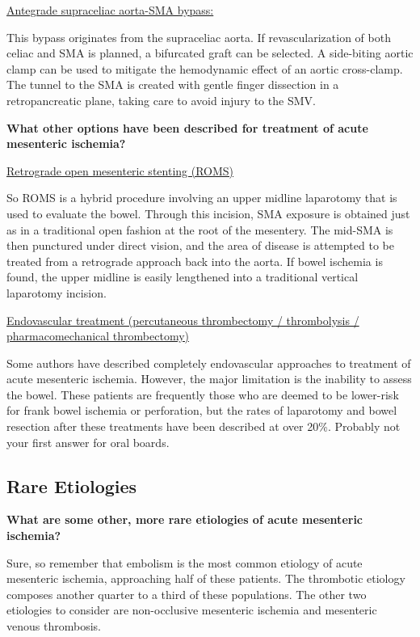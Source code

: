 \documentclass[
]{book}
\begin{document}
\underline{Antegrade supraceliac aorta-SMA bypass:}

This bypass originates from the supraceliac aorta. If revascularization
of both celiac and SMA is planned, a bifurcated graft can be selected. A
side-biting aortic clamp can be used to mitigate the hemodynamic effect
of an aortic cross-clamp. The tunnel to the SMA is created with gentle
finger dissection in a retropancreatic plane, taking care to avoid
injury to the SMV.

\textbf{What other options have been described for treatment of acute
mesenteric ischemia?}

\underline{Retrograde open mesenteric stenting (ROMS)}

So ROMS is a hybrid procedure involving an upper midline laparotomy that
is used to evaluate the bowel. Through this incision, SMA exposure is
obtained just as in a traditional open fashion at the root of the
mesentery. The mid-SMA is then punctured under direct vision, and the
area of disease is attempted to be treated from a retrograde approach
back into the aorta. If bowel ischemia is found, the upper midline is
easily lengthened into a traditional vertical laparotomy incision.

\underline{Endovascular treatment (percutaneous thrombectomy / thrombolysis /
pharmacomechanical thrombectomy)}

Some authors have described completely endovascular approaches to
treatment of acute mesenteric ischemia. However, the major limitation is
the inability to assess the bowel. These patients are frequently those
who are deemed to be lower-risk for frank bowel ischemia or perforation,
but the rates of laparotomy and bowel resection after these treatments
have been described at over 20\%. Probably not your first answer for oral
boards.

\hypertarget{rare-etiologies}{%
\subsection{Rare Etiologies}\label{rare-etiologies}}

\textbf{What are some other, more rare etiologies of acute mesenteric
ischemia?}

Sure, so remember that embolism is the most common etiology of acute
mesenteric ischemia, approaching half of these patients. The thrombotic
etiology composes another quarter to a third of these populations. The
other two etiologies to consider are non-occlusive mesenteric ischemia
and mesenteric venous thrombosis.
\end{document}
